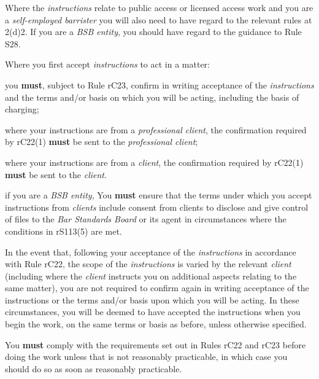 Where the \emph{instructions} relate to public access or licensed access
work and you are a \emph{self-employed barrister} you will also need to
have regard to the relevant rules at 2(d)2. If you are a \emph{BSB
entity}, you should have regard to the guidance to Rule S28.




Where you first accept \emph{instructions} to act in a matter:
\begin{numlist}\item you \textcolor{myred}{\textbf{must}}, subject to Rule rC23, confirm in writing acceptance of the
\emph{instructions} and the terms and/or basis on which you will be
acting, including the basis of charging;
\item where your instructions are from a \emph{professional client}, the
confirmation required by rC22(1) \textcolor{myred}{\textbf{must}} be sent to the \emph{professional
client};
\item where your instructions are from a \emph{client}, the confirmation
required by rC22(1) \textcolor{myred}{\textbf{must}} be sent to the \emph{client}.
\item if you are a \emph{BSB entity}, You \textcolor{myred}{\textbf{must}} ensure that the terms under
which you accept instructions from \emph{clients} include consent from
clients to disclose and give control of files to the \emph{Bar Standards
Board} or its agent in circumstances where the conditions in rS113(5) are
met.\end{numlist}



In the event that, following your acceptance of the \emph{instructions}
in accordance with Rule rC22, the scope of the \emph{instructions} is
varied by the relevant \emph{client} (including where the \emph{client}
instructs you on additional aspects relating to the same matter), you
are not required to confirm again in writing acceptance of the
instructions or the terms and/or basis upon which you will be acting. In
these circumstances, you will be deemed to have accepted the
instructions when you begin the work, on the same terms or basis as
before, unless otherwise specified.


You \textcolor{myred}{\textbf{must}} comply with the requirements set out in Rules rC22 and rC23
before doing the work unless that is not reasonably practicable, in
which case you should do so as soon as reasonably practicable.


